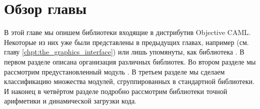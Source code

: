 \section {Обзор главы}
\label{sec:chapter_outline_8}

В этой главе мы опишем библиотеки входящие в дистрибутив Objective CAML. 
Некоторые из них уже были представлены в предыдущих главах, например 
 (см. главу \ref{chpt:the_graphics_interface}) или лишь 
упомянуты, как библиотека . В первом разделе описана организация 
различных библиотек. Во втором разделе мы рассмотрим предустановленный модуль 
. В третьем разделе мы сделаем классификацию множества 
модулей, сгруппированных в стандартной библиотеки. И наконец в четвёртом 
разделе подробно рассмотрим библиотеки точной арифметики и динамической загрузки 
кода.
